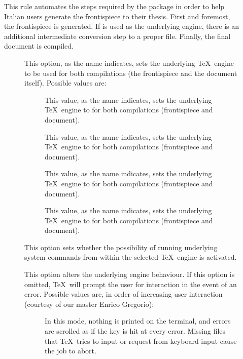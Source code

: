 \begin{description}
\item[]
This rule automates the steps required by the  package in order to help Italian users generate the frontispiece to their thesis. First and foremost, the frontispiece is generated. If  is used as the underlying engine, there is an additional intermediate conversion step to a proper  file. Finally, the final document is compiled.

\begin{description}
\item[] This option, as the name indicates, sets the underlying \TeX\ engine to be used for both compilations (the frontispiece and the document itself). Possible values are:

\begin{description}
\item[] This value, as the name indicates, sets the underlying \TeX\ engine to  for both compilations (frontispiece and document).

\item[] This value, as the name indicates, sets the underlying \TeX\ engine to  for both compilations (frontispiece and document).

\item[] This value, as the name indicates, sets the underlying \TeX\ engine to  for both compilations (frontispiece and document).

\item[] This value, as the name indicates, sets the underlying \TeX\ engine to  for both compilations (frontispiece and document).
\end{description}

\item[] This option sets whether the possibility of running underlying system commands from within the selected \TeX\ engine is activated.

\item[] This option alters the underlying engine behaviour. If this option is omitted, \TeX\ will prompt the user for interaction in the event of an error. Possible values are, in order of increasing user interaction (courtesy of our master Enrico Gregorio):

\begin{description}
\item[] In this mode, nothing is printed on the terminal, and errors are scrolled as if the  key is hit at every error. Missing files that \TeX\ tries to input or request from keyboard input cause the job to abort.


\end{description}
\end{description}
\end{description}

